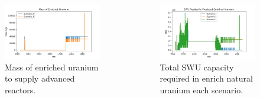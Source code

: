 \begin{frame}
\begin{columns}
\begin{figure}[t]
      \includegraphics[trim=0 8 0 10,clip,width=\linewidth]{figures/enrichedU_advancedrx.png}
            \vspace*{-0.5cm}
      \caption{Mass of enriched uranium to supply advanced reactors.}
      \label{fig:enrichedU}
  \end{figure}
            \vspace*{-0.5cm}
  \begin{figure}[h]
      \includegraphics[trim=0 8 0 10,clip,width=\linewidth]{figures/swu_all.png}
            \vspace*{-0.5cm}
      \caption{Total \gls{SWU} capacity required in enrich natural uranium each scenario.}
      \label{fig:swu}
  \end{figure}
  \end{columns}
\end{frame}


